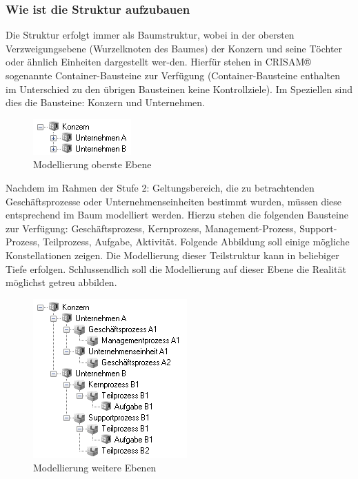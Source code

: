 \subsubsection{Wie ist die Struktur aufzubauen}
Die Struktur erfolgt immer als Baumstruktur, wobei in der obersten Verzweigungsebene (Wurzelknoten des Baumes) der Konzern und seine Töchter oder ähnlich Einheiten dargestellt wer-den. Hierfür stehen in CRISAM® sogenannte Container-Bausteine zur Verfügung (Container-Bausteine enthalten im Unterschied zu den übrigen Bausteinen keine Kontrollziele). Im Speziellen sind dies die Bausteine: Konzern und Unternehmen.

\begin{figure}[htbp]
	\centering
	\includegraphics[scale =1 ]{images/Modellierung.png}
	\caption{Modellierung oberste Ebene}
	\label{fig:bsp}
\end{figure}
Nachdem im Rahmen der Stufe 2: Geltungsbereich, die zu betrachtenden Geschäftsprozesse oder Unternehmenseinheiten bestimmt wurden, müssen diese entsprechend im Baum modelliert werden. Hierzu stehen die folgenden Bausteine zur Verfügung: Geschäftsprozess, Kernprozess, Management-Prozess, Support-Prozess, Teilprozess, Aufgabe, Aktivität.
Folgende Abbildung soll einige mögliche Konstellationen zeigen. Die Modellierung dieser Teilstruktur kann in beliebiger Tiefe erfolgen. Schlussendlich soll die Modellierung auf dieser Ebene die Realität möglichst getreu abbilden.

\begin{figure}[htbp]
	\centering
	\includegraphics[scale =1 ]{images/weiterebenen.png}
	\caption{Modellierung weitere Ebenen}
	\label{fig:bsp}
\end{figure}

